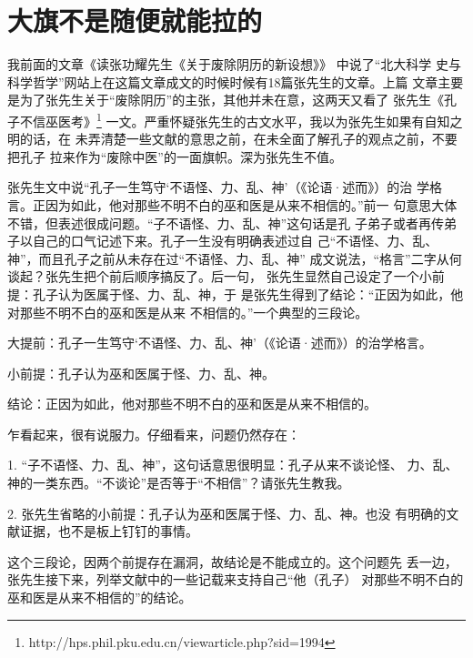 \chapter{大旗不是随便就能拉的}

\subtitle{——读张功耀《孔子不信巫医考》}

我前面的文章《读张功耀先生《关于废除阴历的新设想》》 中说了“北大科学
史与科学哲学”网站上在这篇文章成文的时候时候有18篇张先生的文章。上篇
文章主要是为了张先生关于“废除阴历”的主张，其他并未在意，这两天又看了
张先生《孔子不信巫医考》\footnote{http://hps.phil.pku.edu.cn/viewarticle.php?sid=1994}
一文。严重怀疑张先生的古文水平，我以为张先生如果有自知之明的话，在
未弄清楚一些文献的意思之前，在未全面了解孔子的观点之前，不要把孔子
拉来作为“废除中医”的一面旗帜。深为张先生不值。

张先生文中说“孔子一生笃守‘不语怪、力、乱、神’（《论语·述而》）的治
学格言。正因为如此，他对那些不明不白的巫和医是从来不相信的。”前一
句意思大体不错，但表述很成问题。“子不语怪、力、乱、神”这句话是孔
子弟子或者再传弟子以自己的口气记述下来。孔子一生没有明确表述过自
己“不语怪、力、乱、神”，而且孔子之前从未存在过“不语怪、力、乱、神”
成文说法，“格言”二字从何谈起？张先生把个前后顺序搞反了。后一句，
张先生显然自己设定了一个小前提：孔子认为医属于怪、力、乱、神，于
是张先生得到了结论：“正因为如此，他对那些不明不白的巫和医是从来
不相信的。”一个典型的三段论。

大提前：孔子一生笃守‘不语怪、力、乱、神’（《论语·述而》）的治学格言。

小前提：孔子认为巫和医属于怪、力、乱、神。

结\quad 论：正因为如此，他对那些不明不白的巫和医是从来不相信的。

乍看起来，很有说服力。仔细看来，问题仍然存在：

1.  “子不语怪、力、乱、神”，这句话意思很明显：孔子从来不谈论怪、
力、乱、神的一类东西。“不谈论”是否等于“不相信”？请张先生教我。

2.  张先生省略的小前提：孔子认为巫和医属于怪、力、乱、神。也没
有明确的文献证据，也不是板上钉钉的事情。

这个三段论，因两个前提存在漏洞，故结论是不能成立的。这个问题先
丢一边，张先生接下来，列举文献中的一些记载来支持自己“他（孔子）
对那些不明不白的巫和医是从来不相信的”的结论。

